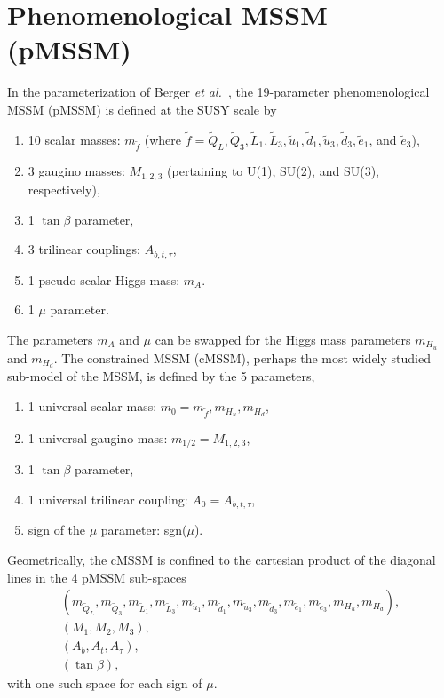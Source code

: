 \section{Phenomenological MSSM (pMSSM)}

In the parameterization  of Berger \emph{et al.}~\cite{pMSSM1}, 
the  19-parameter 
phenomenological MSSM (pMSSM) is defined at the SUSY scale by

\begin{enumerate}
         \item 10 scalar masses: $m_{\tilde{f}}$ (where 
$\tilde{f} = \tilde{Q}_L, \tilde{Q}_3, \tilde{L}_1, \tilde{L}_3, 
\tilde{u}_1, \tilde{d}_1, 
\tilde{u}_3, \tilde{d}_3, \tilde{e}_1$, and $\tilde{e}_3$),

         \item 3 gaugino masses: $M_{1,2,3}$ (pertaining to U(1), SU(2), 
and SU(3), respectively),
         
         \item 1 $\tan\beta$ parameter,
         
         \item 3 trilinear couplings: $A_{b, t, \tau}$,
         
         \item 1 pseudo-scalar Higgs mass: $m_A$.
         
         \item 1 $\mu$ parameter. 
         
\end{enumerate}
The parameters $m_A$ and $\mu$ can be swapped for the Higgs mass parameters 
$m_{H_u}$ and $m_{H_d}$.
The constrained MSSM (cMSSM), perhaps
the most widely studied sub-model of the MSSM,
is defined by the 5 parameters,

\begin{enumerate}
         \item 1 universal scalar mass: $m_0 = m_{\tilde{f}}, 
m_{H_u}, m_{H_d}$,
    
         \item 1 universal gaugino mass: $m_{1/2} = M_{1,2,3}$,
         
         \item 1 $\tan\beta$ parameter,
         
         \item 1 universal trilinear coupling: $A_0 = A_{b, t, \tau}$,
         
         \item sign of the $\mu$ parameter: sgn($\mu$).
\end{enumerate}
Geometrically, the cMSSM is confined to 
the cartesian product of the
diagonal lines in the 4 pMSSM sub-spaces
\begin{eqnarray} 
(m_{\tilde{Q}_L}, m_{\tilde{Q}_3}, m_{\tilde{L}_1}, 
m_{\tilde{L}_3}, m_{\tilde{u}_1}, 
m_{\tilde{d}_1}, 
m_{\tilde{u}_3}, 
m_{\tilde{d}_3}, 
m_{\tilde{e}_1}, 
m_{\tilde{e}_3},  
m_{H_u}, 
m_{H_d}), \\ \nonumber
(M_1, 
M_2, 
M_3), \\ \nonumber
(A_b, A_t, A_{\tau}), \\ \nonumber 
(\tan\beta),
\end{eqnarray}
with one such space for each sign of $\mu$. 


